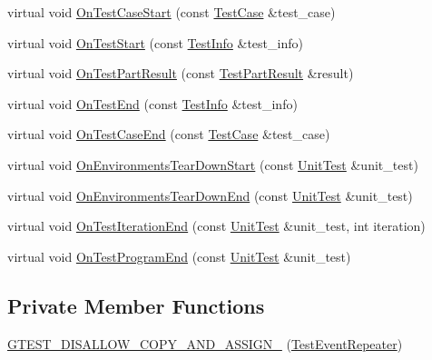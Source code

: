 \begin{DoxyCompactItemize}
\item 
virtual void \hyperlink{classtesting_1_1internal_1_1TestEventRepeater_a70124c738caa338bcd723eb2a51c8b3e}{On\+Test\+Case\+Start} (const \hyperlink{classtesting_1_1TestCase}{Test\+Case} \&test\+\_\+case)
\item 
virtual void \hyperlink{classtesting_1_1internal_1_1TestEventRepeater_a70d694ca5010cc86cd458f7f529e6fbe}{On\+Test\+Start} (const \hyperlink{classtesting_1_1TestInfo}{Test\+Info} \&test\+\_\+info)
\item 
virtual void \hyperlink{classtesting_1_1internal_1_1TestEventRepeater_ac8fb21da6802b1ebab9cad3eee9150eb}{On\+Test\+Part\+Result} (const \hyperlink{classtesting_1_1TestPartResult}{Test\+Part\+Result} \&result)
\item 
virtual void \hyperlink{classtesting_1_1internal_1_1TestEventRepeater_aa0f13bded9369aae1c78583d7276f8b1}{On\+Test\+End} (const \hyperlink{classtesting_1_1TestInfo}{Test\+Info} \&test\+\_\+info)
\item 
virtual void \hyperlink{classtesting_1_1internal_1_1TestEventRepeater_a0a335e1c3957a8c699ed56e37ea7b978}{On\+Test\+Case\+End} (const \hyperlink{classtesting_1_1TestCase}{Test\+Case} \&test\+\_\+case)
\item 
virtual void \hyperlink{classtesting_1_1internal_1_1TestEventRepeater_a30db75df2d9a65d787f31e16004613c2}{On\+Environments\+Tear\+Down\+Start} (const \hyperlink{classtesting_1_1UnitTest}{Unit\+Test} \&unit\+\_\+test)
\item 
virtual void \hyperlink{classtesting_1_1internal_1_1TestEventRepeater_a8428220c4cf9f0cea2dfd9a70f07ab7f}{On\+Environments\+Tear\+Down\+End} (const \hyperlink{classtesting_1_1UnitTest}{Unit\+Test} \&unit\+\_\+test)
\item 
virtual void \hyperlink{classtesting_1_1internal_1_1TestEventRepeater_a94253e3c11753328e8a031f39352708f}{On\+Test\+Iteration\+End} (const \hyperlink{classtesting_1_1UnitTest}{Unit\+Test} \&unit\+\_\+test, int iteration)
\item 
virtual void \hyperlink{classtesting_1_1internal_1_1TestEventRepeater_a4622616259747dbcc23f5ee39ef99ec0}{On\+Test\+Program\+End} (const \hyperlink{classtesting_1_1UnitTest}{Unit\+Test} \&unit\+\_\+test)
\end{DoxyCompactItemize}
\subsection*{Private Member Functions}
\begin{DoxyCompactItemize}
\item 
\hyperlink{classtesting_1_1internal_1_1TestEventRepeater_a882648737e85eff0986ff66b794e310a}{G\+T\+E\+S\+T\+\_\+\+D\+I\+S\+A\+L\+L\+O\+W\+\_\+\+C\+O\+P\+Y\+\_\+\+A\+N\+D\+\_\+\+A\+S\+S\+I\+G\+N\+\_\+} (\hyperlink{classtesting_1_1internal_1_1TestEventRepeater}{Test\+Event\+Repeater})
\end{DoxyCompactItemize}
